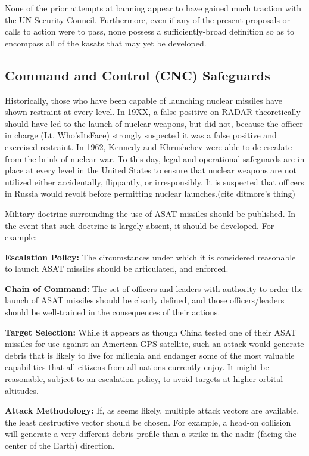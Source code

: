None of the prior attempts at banning appear to have gained much
traction with the UN Security Council.  Furthermore, even if any of
the present proposals or calls to action were to pass, none possess a
sufficiently-broad definition so as to encompass all of the
\acp{kasat} that may yet be developed.

\subsection{Command and Control (CNC) Safeguards}
Historically, those who have been capable of launching nuclear
missiles have shown restraint at every level.  In 19XX, a false
positive on RADAR theoretically should have led to the launch of
nuclear weapons, but did not, because the officer in charge
(Lt. Who'sItsFace) strongly suspected it was a false positive and
exercised restraint.  In 1962, Kennedy and Khrushchev were able to
de-escalate from the brink of nuclear war.  To this day, legal and
operational safeguards are in place at every level in the United
States to ensure that nuclear weapons are not utilized either
accidentally, flippantly, or irresponsibly.  It is suspected that
officers in Russia would revolt before permitting nuclear
launches.(cite ditmore's thing)

Military doctrine surrounding the use of ASAT missiles should be
published.  In the event that such doctrine is largely absent, it
should be developed.  For example:

\textbf{Escalation Policy:} The circumstances under which it is
considered reasonable to launch ASAT missiles should be articulated,
and enforced.

\textbf{Chain of Command:} The set of officers and leaders with
authority to order the launch of ASAT missiles should be clearly
defined, and those officers/leaders should be well-trained in the
consequences of their actions.

\textbf{Target Selection:} While it appears as though China tested one
of their ASAT missiles for use against an American GPS satellite, such
an attack would generate debris that is likely to live for millenia
and endanger some of the most valuable capabilities that all citizens
from all nations currently enjoy.  It might be reasonable, subject to
an escalation policy, to avoid targets at higher orbital altitudes.

\textbf{Attack Methodology:} If, as seems likely, multiple attack
vectors are available, the least destructive vector should be chosen.
For example, a head-on collision will generate a very different debris
profile than a strike in the nadir (facing the center of the Earth)
direction.

